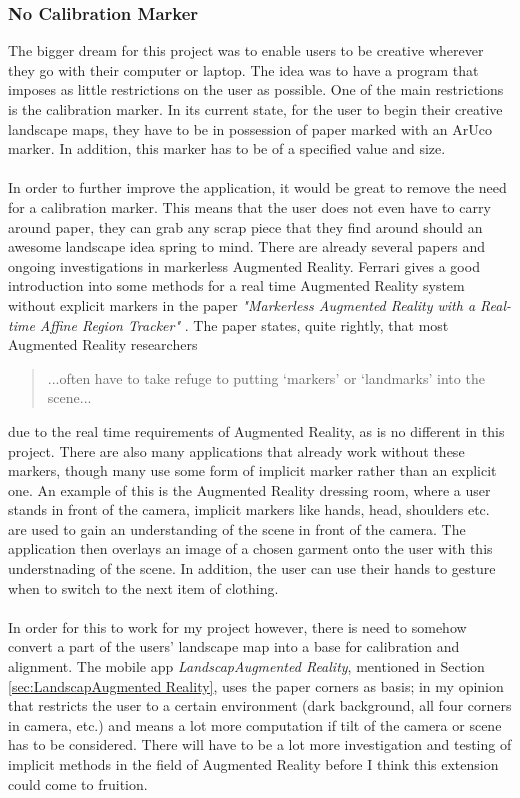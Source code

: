 \documentclass[11pt]{article}
\begin{document}
\subsubsection{No Calibration Marker}
The bigger dream for this project was to enable users to be creative 
wherever they go with their computer or laptop. The idea was to have a
program that imposes as little restrictions on the user as 
possible. One of the main restrictions is the calibration marker. In its
current state, for the user to begin their creative landscape maps, they
have to be in possession of paper marked with an ArUco marker. In addition,
this marker has to be of a specified value and size. \\
\\
In order to further improve the application, it would be great to remove 
the need for a calibration marker. This means that the user does not even 
have to carry around paper, they can grab any scrap piece that they find 
around should an awesome landscape idea spring to mind. There are already
several papers and ongoing
investigations in markerless Augmented Reality. Ferrari
gives a good introduction into some methods for a real time Augmented Reality
system without explicit markers in the paper \textit{"Markerless Augmented 
Reality with a Real-time Affine Region Tracker"} \cite{Ferrari}. 
The paper states, quite rightly, that most Augmented Reality researchers

\begin{quote}
	...often have to take refuge to putting ‘markers’ or 
	‘landmarks’ into the scene...
\end{quote}
 
due to the real time requirements of Augmented Reality, as is no different in this project.
There are also many applications that already work without these markers,
though many use some form of implicit marker rather than an explicit one.
An example of this is the Augmented Reality dressing room, where a user 
stands in front of the camera, implicit markers like hands, head, shoulders
etc. are used to gain an understanding of the scene in front of the camera.
The application then overlays an image of a chosen garment onto the user
with this understnading of the scene. In addition, the user can use
their hands to gesture when to switch to the next item of clothing.\\
\\
In order for this to work for my project however, there is need to
somehow convert a part of the users' landscape map into a base for 
calibration and alignment. The mobile app \textit{LandscapAugmented Reality}, mentioned
in Section \ref{sec:LandscapAugmented Reality}, uses the paper corners as basis; in my
opinion that restricts the user to a certain environment (dark background,
all four corners in camera, etc.) and means a lot more computation if
tilt of the camera or scene has to be considered. There will have to be
a lot more investigation and testing of implicit methods in the field of
Augmented Reality before I think this extension could come to fruition.
\end{document}
